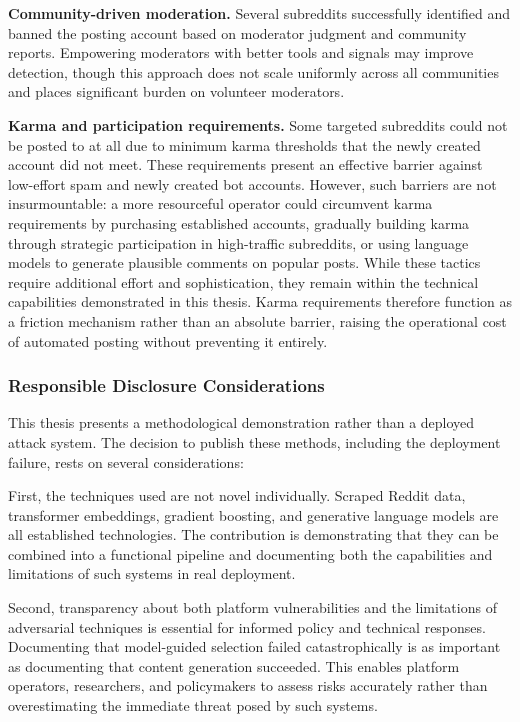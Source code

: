 \textbf{Community-driven moderation.} Several subreddits successfully identified and banned the posting account based on moderator judgment and community reports. Empowering moderators with better tools and signals may improve detection, though this approach does not scale uniformly across all communities and places significant burden on volunteer moderators.

\textbf{Karma and participation requirements.} Some targeted subreddits could not be posted to at all due to minimum karma thresholds that the newly created account did not meet. These requirements present an effective barrier against low-effort spam and newly created bot accounts. However, such barriers are not insurmountable: a more resourceful operator could circumvent karma requirements by purchasing established accounts, gradually building karma through strategic participation in high-traffic subreddits, or using language models to generate plausible comments on popular posts. While these tactics require additional effort and sophistication, they remain within the technical capabilities demonstrated in this thesis. Karma requirements therefore function as a friction mechanism rather than an absolute barrier, raising the operational cost of automated posting without preventing it entirely.

\subsubsection*{Responsible Disclosure Considerations}

This thesis presents a methodological demonstration rather than a deployed attack system. The decision to publish these methods, including the deployment failure, rests on several considerations:

First, the techniques used are not novel individually. Scraped Reddit data, transformer embeddings, gradient boosting, and generative language models are all established technologies. The contribution is demonstrating that they can be combined into a functional pipeline and documenting both the capabilities and limitations of such systems in real deployment.

Second, transparency about both platform vulnerabilities and the limitations of adversarial techniques is essential for informed policy and technical responses. Documenting that model-guided selection failed catastrophically is as important as documenting that content generation succeeded. This enables platform operators, researchers, and policymakers to assess risks accurately rather than overestimating the immediate threat posed by such systems.

